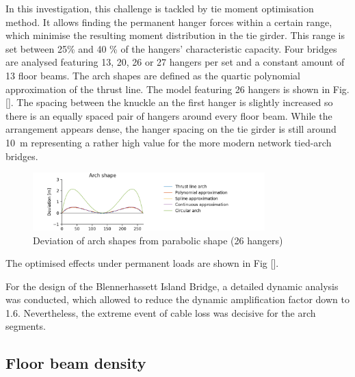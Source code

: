 In this investigation, this challenge is tackled by tie moment optimisation method. It allows finding the permanent hanger forces within a certain range, which minimise the resulting moment distribution in the tie girder. This range is set between 25\% and 40 \% of the hangers' characteristic capacity.  Four bridges are analysed featuring 13, 20, 26 or 27 hangers per set and a constant amount of 13 floor beams. The arch shapes are defined as the quartic polynomial approximation of the thrust line. The model featuring 26 hangers is shown in Fig. []. The spacing between the knuckle an the first hanger is slightly increased so there is an equally spaced pair of hangers around every floor beam. While the arrangement appears dense, the hanger spacing on the tie girder is still around \SI{10}{m} representing a rather high value for the more modern network tied-arch bridges.



\begin{figure}[H]
    \centering
    \includegraphics[trim={0 0 2cm 0},clip, width=0.8\textwidth]{calculations/arch shape/arch_shapes_26.png}
    \caption{Deviation of arch shapes from parabolic shape (26 hangers)}
    \label{fig:arch_shapes_26}
\end{figure}

The optimised effects under permanent loads are shown in Fig [].

For the design of the Blennerhassett Island Bridge, a detailed dynamic analysis was conducted, which allowed to reduce the dynamic amplification factor down to 1.6. Nevertheless, the extreme event of cable loss was decisive for the arch segments.

\subsection{Floor beam density}
